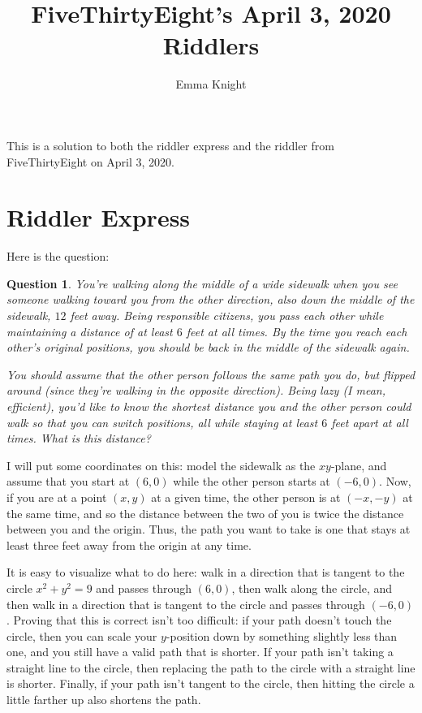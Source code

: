 \documentclass[11pt]{article}
\title{FiveThirtyEight's April 3, 2020 Riddlers}
\author{Emma Knight}
\newtheorem{question}[theorem]{Question}
\theoremstyle{definition}
\begin{document}
\maketitle
This is a solution to both the riddler express and the riddler from FiveThirtyEight on April 3, 2020.
\section{Riddler Express}
Here is the question:
\begin{question}
You're walking along the middle of a wide sidewalk when you see someone walking toward you from the other direction, also down the middle of the sidewalk, $12$ feet away. Being responsible citizens, you pass each other while maintaining a distance of at least $6$ feet at all times. By the time you reach each other’s original positions, you should be back in the middle of the sidewalk again.

You should assume that the other person follows the same path you do, but flipped around (since they're walking in the opposite direction).  Being lazy (I mean, efficient), you'd like to know the shortest distance you and the other person could walk so that you can switch positions, all while staying at least $6$ feet apart at all times.  What is this distance?
\end{question}

I will put some coordinates on this: model the sidewalk as the $xy$-plane, and assume that you start at $(6,0)$ while the other person starts at $(-6,0)$.  Now, if you are at a point $(x,y)$ at a given time, the other person is at $(-x, -y)$ at the same time, and so the distance between the two of you is twice the distance between you and the origin.  Thus, the path you want to take is one that stays at least three feet away from the origin at any time.

It is easy to visualize what to do here: walk in a direction that is tangent to the circle $x^2+y^2 = 9$ and passes through $(6,0)$, then walk along the circle, and then walk in a direction that is tangent to the circle and passes through $(-6,0)$.  Proving that this is correct isn't too difficult: if your path doesn't touch the circle, then you can scale your $y$-position down by something slightly less than one, and you still have a valid path that is shorter.  If your path isn't taking a straight line to the circle, then replacing the path to the circle with a straight line is shorter.  Finally, if your path isn't tangent to the circle, then hitting the circle a little farther up also shortens the path.
\end{document}
